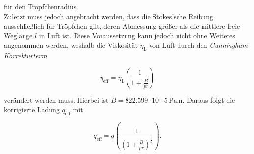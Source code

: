 \noindent für den Tröpfchenradius.\\

\noindent Zuletzt muss jedoch angebracht werden, dass die Stokes'sche Reibung ausschließlich für Tröpfchen gilt, deren Abmessung
größer als die mittlere freie Weglänge $\bar{l}$ in Luft ist. Diese Voraussetzung kann jedoch nicht ohne Weiteres
angenommen werden, weshalb die Viskosität $\eta_\text{L}$ von Luft durch den \emph{Cunningham-Korrekturterm} 

\begin{equation*}
    \eta_\text{eff} = \eta_\text{L}\left(\frac{1}{1 + \frac{B}{pr}}\right)
\end{equation*}

\noindent verändert werden muss. Hierbei ist $B = 822.599\cdot{}10{-5}\,\unit{\pascal\meter}$. Daraus folgt die korrigierte 
Ladung $q_\text{eff}$ mit 

\begin{equation}
\label{eqn:cunningLad}
    q_\text{eff} = q\left(\frac{1}{\left(1+\frac{B}{pr}\right)^{\frac{3}{2}}}\right).
\end{equation}

